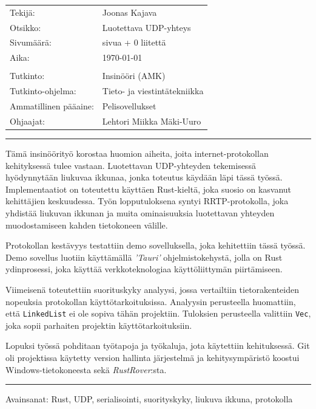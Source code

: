 \documentclass[a4paper,12pt]{article}
\newcommand{\me}{Joonas Kajava}
\renewcommand{\title}{Luotettava UDP-yhteys}
\newcommand{\appendixCount}{0}
\newcommand{\pageCount}{ \pageref{LastPage}}
\newcommand*\sepline{
    \begin{center}
        \rule[1ex]{\textwidth}{.5pt}
    \end{center}}
\begin{document}
\begin{titlepage}
        \begin{tabular} {l l}
            Tekijä:               & \me                                            \\
            Otsikko:              & \title                                         \\
            Sivumäärä:            & \pageCount{} sivua + \appendixCount{} liitettä \\
            Aika:                 & \today                                         \\
            \\
            Tutkinto: & Insinööri (AMK) \\
            Tutkinto-ohjelma: & Tieto- ja viestintätekniikka \\
            Ammatillinen pääaine: & Pelisovellukset \\
            Ohjaajat: & Lehtori Miikka Mäki-Uuro\\
        \end{tabular}
        \sepline
        Tämä insinöörityö korostaa huomion aiheita, joita internet-protokollan kehityksessä tulee vastaan. Luotettavan UDP-yhteyden tekemisessä hyödynnytään liukuvaa ikkunaa, jonka toteutus käydään läpi tässä työssä. Implementaatiot on toteutettu käyttäen Rust-kieltä, joka suosio on kasvanut kehittäjien keskuudessa. Työn lopputuloksena syntyi RRTP-protokolla, joka yhdistää liukuvan ikkunan ja muita ominaisuuksia luotettavan yhteyden muodostamiseen kahden tietokoneen välille. \par

        Protokollan kestävyys testattiin demo sovelluksella, joka kehitettiin tässä työssä. Demo sovellus luotiin käyttämällä \textit{'Tauri'} ohjelmistokehystä, jolla on Rust ydinprosessi, joka käyttää verkkoteknologiaa käyttöliittymän piirtämiseen. \par

        Viimeisenä toteutettiin suorituskyky analyysi, jossa vertailtiin tietorakenteiden nopeuksia protokollan käyttötarkoituksissa. Analyysin perusteella huomattiin, että \lstinline{LinkedList} ei ole sopiva tähän projektiin. Tuloksien perusteella valittiin \lstinline{Vec}, joka sopii parhaiten projektin käyttötarkoituksiin.\par

        Lopuksi työssä pohditaan työtapoja ja työkaluja, jota käytettiin kehituksessä. Git oli projektissa käytetty version hallinta järjestelmä ja kehitysympäristö koostui Windows-tietokoneesta sekä \textit{RustRover}:sta.
        \sepline
        Avainsanat: Rust, UDP, serialisointi, suorityskyky, liukuva ikkuna, protokolla 
        \newpage


\end{titlepage}
\end{document}
